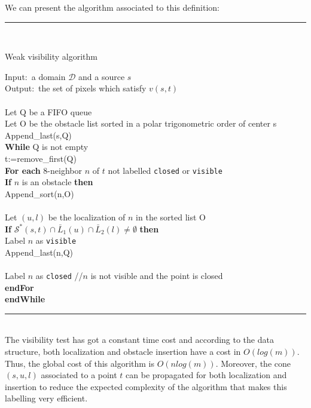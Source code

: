 \documentclass[fleqn,twoside]{article}
\begin{document}
We can present the algorithm associated to this definition:\ \\
{\small \hrule 
\ \\
\centerline{\textsf{Weak visibility algorithm}}
{\sf
Input:~a domain $\mathcal{D}$ and a source $s$\\
Output:~the set of pixels which satisfy $v(s,t)$\\
\ \\
Let Q be a FIFO queue\\
Let O be the obstacle list sorted in a polar trigonometric order of center s\\
Append\_last(s,Q)\\
{\bf While} Q is not empty\\
\hspace*{0.5cm} t:=remove\_first(Q)\\
\hspace*{0.5cm} {\bf For each} 8-neighbor $n$ of $t$ not labelled {\tt closed} or {\tt visible}\\
\hspace*{1cm} {\bf If} $n$ is an obstacle {\bf then}\\
\hspace*{1.5cm} Append\_sort(n,O)\\
\hspace*{1cm}{\bf else}\\
\hspace*{1.5cm} Let $(u,l)$ be the localization of $n$ in the sorted list O\\
\hspace*{1.5cm} {\bf If} $\mathcal{S}^*(s,t) \cap \bar{L}_1(u) \cap \bar{L}_2(l) \neq \emptyset$ {\bf then }\\
\hspace*{2cm} Label $n$ as {\tt visible}\\
\hspace*{2cm} Append\_last(n,Q)\\
\hspace*{1.5cm}{\bf else}\\
\hspace*{2cm} Label $n$ as {\tt closed} //$n$ is not visible and the point is closed\\
\hspace*{0.5cm} {\bf endFor}\\
{\bf endWhile}\\
}
\hrule}\ \\

The visibility test has got a constant time cost  and according to the
data structure, both localization  and obstacle insertion have  a cost
in    $O(log(m))$. Thus,  the  global  cost     of this algorithm   is
$O(nlog(m))$. Moreover, the  cone $(s,u,l)$ associated  to a point $t$
can be  propagated for both localization  and insertion  to reduce the
expected  complexity of the algorithm that   makes this labelling very
efficient.
\end{document}

